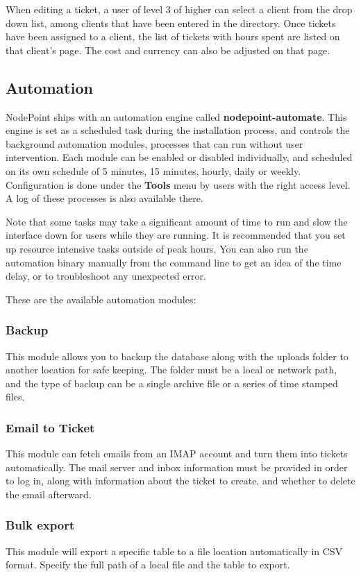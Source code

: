 \documentclass[11pt]{article}
\begin{document}
When editing a ticket, a user of level 3 of higher can select a client from the drop down list, among clients that have been entered in the directory. Once tickets have been assigned to a client, the list of tickets with hours spent are listed on that client's page. The cost and currency can also be adjusted on that page.

\subsection{Automation}
NodePoint ships with an automation engine called \textbf{nodepoint-automate}. This engine is set as a scheduled task during the installation process, and controls the background automation modules, processes that can run without user intervention. Each module can be enabled or disabled individually, and scheduled on its own schedule of 5 minutes, 15 minutes, hourly, daily or weekly. Configuration is done under the \textbf{Tools} menu by users with the right access level. A log of these processes is also available there.

Note that some tasks may take a significant amount of time to run and slow the interface down for users while they are running. It is recommended that you set up resource intensive tasks outside of peak hours. You can also run the automation binary manually from the command line to get an idea of the time delay, or to troubleshoot any unexpected error.

These are the available automation modules:

\subsubsection{Backup}
This module allows you to backup the database along with the uploads folder to another location for safe keeping. The folder must be a local or network path, and the type of backup can be a single archive file or a series of time stamped files.

\subsubsection{Email to Ticket}
This module can fetch emails from an IMAP account and turn them into tickets automatically. The mail server and inbox information must be provided in order to log in, along with information about the ticket to create, and whether to delete the email afterward.

\subsubsection{Bulk export}
This module will export a specific table to a file location automatically in CSV format. Specify the full path of a local file and the table to export.
\end{document}
